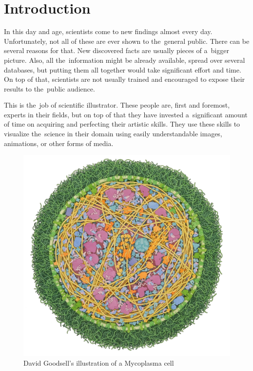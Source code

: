 \documentclass[
  digital, %
  table,   %
  nolof,     %
  nolot,     %
  oneside,
]{fithesis3}
\begin{document}
\chapter{Introduction}
\label{chap:introduction}
In this day and age, scientists come to new findings almost every day. Unfortunately, not all of these are ever shown to the general public. There can be several reasons for that. New discovered facts are usually pieces of a bigger picture. Also, all the information might be already available, spread over several databases, but putting them all together would take significant effort and time.
On top of that, scientists are not usually trained and encouraged to expose their results to the public audience.

This is the job of scientific illustrator. These people are, first and foremost, experts in their fields, but on top of that they have invested a significant amount of time on acquiring and perfecting their artistic skills. They use these skills to visualize the science in their domain using easily understandable images, animations, or other forms of media. %
\begin{figure}
  \centering
  \includegraphics[scale=0.3]{images/goodsell-mycoplasma.jpg}
  \caption{David Goodsell's illustration of a Mycoplasma cell}
  \label{fig:goodsell-mycoplasma}
\end{figure}
\end{document}
